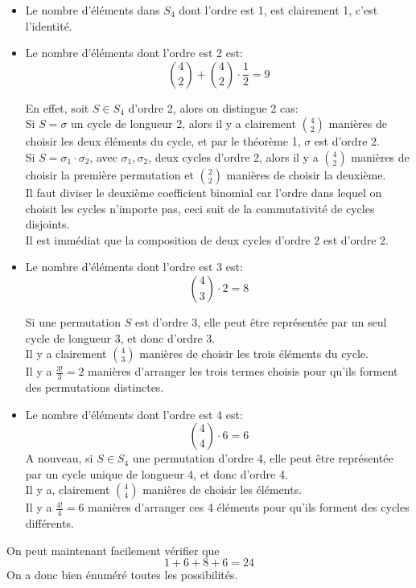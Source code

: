 \documentclass[11pt, a4paper]{article}
\begin{document}
\begin{itemize}
\item Le nombre d'éléments dans $S_4$ dont l'ordre est 1, est clairement 1, c'est l'identité.\\
\item Le nombre d'éléments dont l'ordre est 2 est:
	\[ 
		\binom{4}{2} + \binom{4}{2} \cdot \frac{1}{2} = 9
	\]

En effet, soit $S \in S_4$ d'ordre 2, alors on distingue 2 cas:\\
Si $S = \sigma$ un cycle de longueur 2, alors il y a clairement $\binom{4}{2}$ manières de choisir les deux éléments du cycle, et par le théorème 1, $\sigma$ est d'ordre 2.\\
Si $S= \sigma_1 \cdot \sigma_2$, avec $\sigma_1,\sigma_2$, deux cycles d'ordre 2, alors il y a $\binom{4}{2}$ manières de choisir la première permutation et $\binom{2}{2}$ manières de choisir la deuxième.\\
Il faut diviser le deuxième coefficient binomial car l'ordre dans lequel on choisit les cycles n'importe pas, ceci suit de la commutativité de cycles disjoints.\\
Il est immédiat que la composition de deux cycles d'ordre 2 est d'ordre 2.
\item Le nombre d'éléments dont l'ordre est 3 est:
	\[ 
		\binom{4}{3} \cdot 2 = 8
	\]

Si une permutation $S$ est d'ordre 3, elle peut être représentée par un seul cycle de longueur 3, et donc d'ordre 3.\\
Il y a clairement $\binom{4}{3}$ manières de choisir les trois éléments du cycle.\\
Il y a $\frac{3!}{3}=2$ manières d'arranger les trois termes choisis pour qu'ils forment des permutations distinctes.

\item Le nombre d'éléments dont l'ordre est 4 est:
	\[ 
		\binom{4}{4} \cdot 6 = 6
	\]
A nouveau, si $S \in S_4$ une permutation d'ordre 4, elle peut être représentée par un cycle unique de longueur 4, et donc d'ordre 4.\\
Il y a, clairement $\binom{4}{4}$ manières de choisir les éléments.\\
Il y a $\frac{4!}{4}=6$ manières d'arranger ces 4 éléments pour qu'ils forment des cycles différents.
\end{itemize}
On peut maintenant facilement vérifier que
\[ 
1 + 6 + 8 + 6 = 24
\]
On a donc bien énuméré toutes les possibilités.
\end{document}
